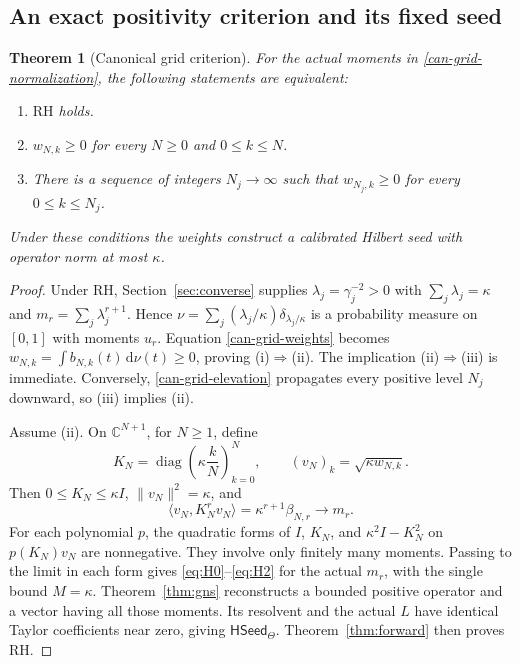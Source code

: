 \documentclass[11pt,a4paper]{article}
\numberwithin{equation}{section}
\newtheorem{theorem}{Theorem}[section]
\theoremstyle{definition}
\theoremstyle{remark}
\newcommand{\C}{\mathbb C}
\newcommand{\ip}[2]{\langle #1,#2\rangle}
\newcommand{\norm}[1]{\lVert #1\rVert}
\newcommand{\RH}{\mathrm{RH}}
\newcommand{\HSeed}{\mathsf{HSeed}_{\Theta}}
\newcommand{\dd}{\,\mathrm d}
\begin{document}
\subsection{An exact positivity criterion and its fixed seed}

\begin{theorem}[Canonical grid criterion]\label{can-grid-criterion}
For the actual moments in \eqref{can-grid-normalization}, the following
statements are equivalent:
\begin{enumerate}[label=(\roman*),leftmargin=2.3em]
\item $\RH$ holds.
\item $w_{N,k}\geq0$ for every $N\geq0$ and $0\leq k\leq N$.
\item There is a sequence of integers $N_j\to\infty$ such that
      $w_{N_j,k}\geq0$ for every $0\leq k\leq N_j$.
\end{enumerate}
Under these conditions the weights construct a calibrated Hilbert seed
with operator norm at most $\kappa$.
\end{theorem}
\begin{proof}
Under RH, Section~\ref{sec:converse} supplies
$\lambda_j=\gamma_j^{-2}>0$ with $\sum_j\lambda_j=\kappa$ and
$m_r=\sum_j\lambda_j^{r+1}$. Hence
$\nu=\sum_j(\lambda_j/\kappa)\delta_{\lambda_j/\kappa}$ is a
probability measure on $[0,1]$ with moments $u_r$. Equation
\eqref{can-grid-weights} becomes
$w_{N,k}=\int b_{N,k}(t)\dd\nu(t)\geq0$, proving (i)$\Rightarrow$(ii).
The implication (ii)$\Rightarrow$(iii) is immediate. Conversely,
\eqref{can-grid-elevation} propagates every positive level $N_j$
downward, so (iii) implies (ii).

Assume (ii). On $\C^{N+1}$, for $N\geq1$, define
\begin{equation}\label{can-grid-finite-seed}
K_N=\operatorname{diag}\left(\kappa\frac{k}{N}\right)_{k=0}^N,
\qquad (v_N)_k=\sqrt{\kappa w_{N,k}}.
\end{equation}
Then $0\leq K_N\leq\kappa I$, $\norm{v_N}^2=\kappa$, and
\begin{equation}\label{can-grid-vector-moments}
\ip{v_N}{K_N^rv_N}=\kappa^{r+1}\beta_{N,r}
\longrightarrow m_r.
\end{equation}
For each polynomial $p$, the quadratic forms of $I$, $K_N$, and
$\kappa^2I-K_N^2$ on $p(K_N)v_N$ are nonnegative. They involve
only finitely many moments. Passing to the limit in each form gives
\eqref{eq:H0}--\eqref{eq:H2} for the actual $m_r$, with the single
bound $M=\kappa$. Theorem~\ref{thm:gns} reconstructs a bounded positive
operator and a vector having all those moments. Its resolvent and the
actual $L$ have identical Taylor coefficients near zero, giving
$\HSeed$. Theorem~\ref{thm:forward} then proves RH.
\end{proof}
\end{document}

